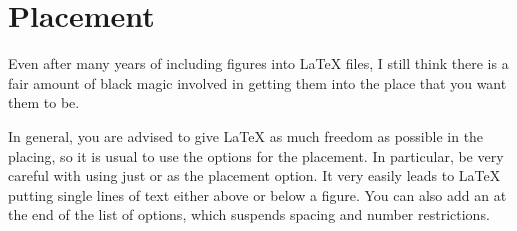
\section{Placement}
\label{sec:fig:placement}

Even after many years of including figures into \LaTeX{} files, I
still think there is a fair amount of black magic involved in getting
them into the place that you want them to be.

In general, you are advised to give \LaTeX{} as much freedom as
possible in the placing, so it is usual to use the options
\Option{[htbp]} for the placement. In particular, be very careful with
using just \Option{[h]} or \Option{[H]} as the placement option. It very
easily leads to \LaTeX{} putting single lines of text either above or
below a figure. You can also add an \Option{!} at the end of the list
of options, which suspends spacing and number restrictions.

